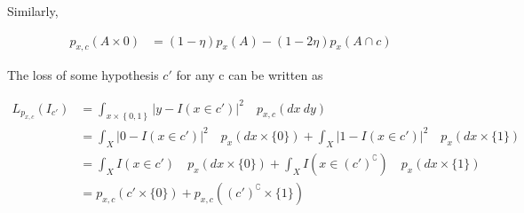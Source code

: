 \documentclass[10pt]{article}
\begin{document}
Similarly,

\begin{align*}
    p_{x,c}(A \times {0}) &= (1-\eta) p_x(A) - (1-2\eta) p_x(A \cap c)
\end{align*}

The loss of some hypothesis $c'$ for any c can be written as 

\begin{align*}
    L_{p_{x,c}}(I_{c'}) &= \int_{x \times \left\{0,1\right\} } \lvert y-I(x \in c') \rvert^2 \quad p_{x,c}(dx\ dy)\\
    &= \int_X \lvert 0-I(x \in c') \rvert^2 \quad p_x(dx \times \{0\}) +
    \int_X \lvert 1-I(x \in c') \rvert^2 \quad p_x(dx \times \{1\})\\
    &= \int_X I(x \in c')  \quad p_x(dx \times \{0\}) +
    \int_X I(x \in (c')^\complement)  \quad p_x(dx \times \{1\})\\
    &= p_{x,c}(c' \times \{0\}) + p_{x,c}( (c')^\complement \times \{1\})
\end{align*}



\end{document}
